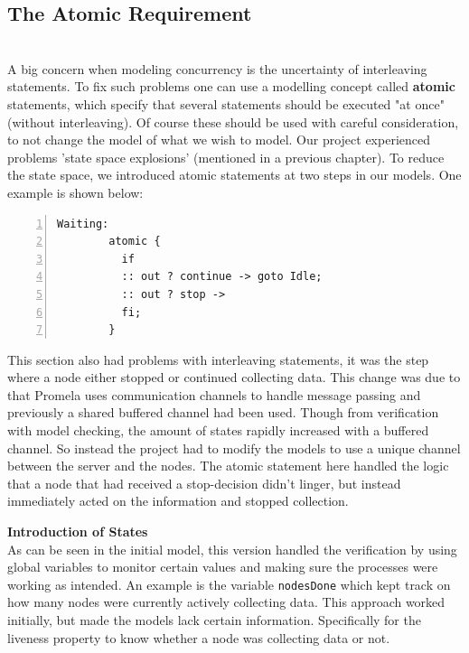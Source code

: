 \subsection{The Atomic Requirement} \\


A big concern when modeling concurrency is the uncertainty of interleaving statements. To fix such problems one can use a modelling concept called \textbf{atomic} statements, which specify that several statements should be executed "at once" (without interleaving). Of course these should be used with careful consideration, to not change the model of what we wish to model. Our project experienced problems 'state space explosions' (mentioned in a previous chapter). To reduce the state space, we introduced atomic statements at two steps in our models. One example is shown below:

\begin{lstlisting}[caption={Atomic statement},language=Promela, numbers=left, basicstyle=\footnotesize, tabsize=2]
Waiting:
        atomic {
          if
          :: out ? continue -> goto Idle;
          :: out ? stop -> 
          fi;
        }
\end{lstlisting}

This section also had problems with interleaving statements, it was the step where a node either stopped or continued collecting data. This change was due to that Promela uses communication channels to handle message passing and previously a shared buffered channel had been used. Though from verification with model checking, the amount of states rapidly increased with a buffered channel. So instead the project had to modify the models to use a unique channel between the server and the nodes. The atomic statement here handled the logic that a node that had received a stop-decision didn't linger, but instead immediately acted on the information and stopped collection.

\textbf{Introduction of States} \\


As can be seen in the initial model, this version handled the verification by using global variables to monitor certain values and making sure the processes were working as intended. An example is the variable \texttt{nodesDone} which kept track on how many nodes were currently actively collecting data. This approach worked initially, but made the models lack certain information. Specifically for the liveness property to know whether a node was collecting data or not. \\ 


